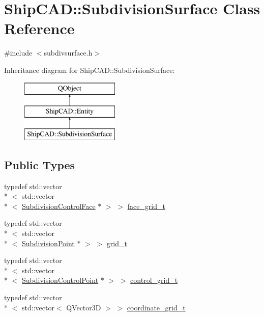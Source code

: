 \hypertarget{classShipCAD_1_1SubdivisionSurface}{\section{Ship\-C\-A\-D\-:\-:Subdivision\-Surface Class Reference}
\label{classShipCAD_1_1SubdivisionSurface}
}


{\ttfamily \#include $<$subdivsurface.\-h$>$}

Inheritance diagram for Ship\-C\-A\-D\-:\-:Subdivision\-Surface\-:\begin{figure}[H]
\begin{center}
\leavevmode
\includegraphics[height=3.000000cm]{classShipCAD_1_1SubdivisionSurface}
\end{center}
\end{figure}
\subsection*{Public Types}
\begin{DoxyCompactItemize}
\item 
typedef std\-::vector\\*
$<$ std\-::vector\\*
$<$ \hyperlink{classShipCAD_1_1SubdivisionControlFace}{Subdivision\-Control\-Face} $\ast$ $>$ $>$ \hyperlink{classShipCAD_1_1SubdivisionSurface_a26a7d7b71acd662b1014ab39af4ee343}{face\-\_\-grid\-\_\-t}
\item 
typedef std\-::vector\\*
$<$ std\-::vector\\*
$<$ \hyperlink{classShipCAD_1_1SubdivisionPoint}{Subdivision\-Point} $\ast$ $>$ $>$ \hyperlink{classShipCAD_1_1SubdivisionSurface_a69d4a3ca038ee247d0abcffa6125df95}{grid\-\_\-t}
\item 
typedef std\-::vector\\*
$<$ std\-::vector\\*
$<$ \hyperlink{classShipCAD_1_1SubdivisionControlPoint}{Subdivision\-Control\-Point} $\ast$ $>$ $>$ \hyperlink{classShipCAD_1_1SubdivisionSurface_ae53cacefe98ce33992a05f941f4ff4ee}{control\-\_\-grid\-\_\-t}
\item 
typedef std\-::vector\\*
$<$ std\-::vector$<$ Q\-Vector3\-D $>$ $>$ \hyperlink{classShipCAD_1_1SubdivisionSurface_a8ed657cb7d4cd34662bd2d3e949d3e3b}{coordinate\-\_\-grid\-\_\-t}
\end{DoxyCompactItemize}
